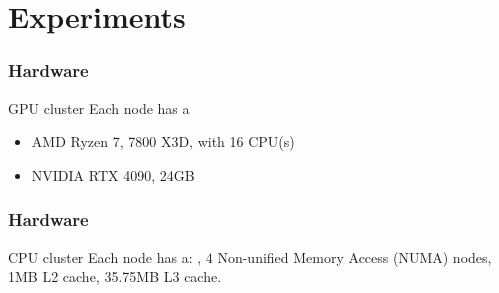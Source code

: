 
\section{Experiments}


\begin{frame}
  \frametitle{Hardware}
  \begin{block}{GPU cluster}
    Each node has a
    \begin{itemize}
      \item AMD Ryzen 7, 7800 X3D, with 16 CPU(s)
      \item NVIDIA RTX 4090, 24GB
    \end{itemize}
  \end{block}

\end{frame}

\begin{frame}
  \frametitle{Hardware}

  \begin{block}{CPU cluster}
    Each node has a: , $4$ Non-unified Memory Access (NUMA) nodes, 1MB L2 cache, 35.75MB L3 cache.
  \end{block}
  \begin{figure}[htbp]
    \centering
\end{figure}
\end{frame}
